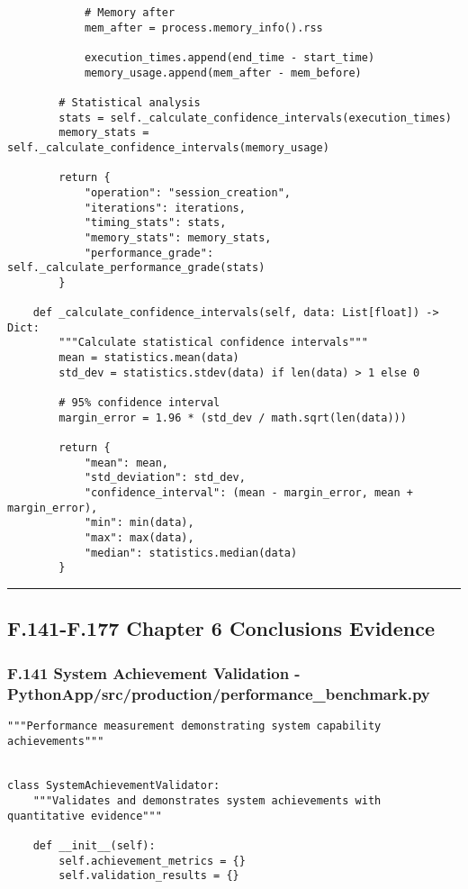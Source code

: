 \documentclass[12pt,a4paper]{report}
\begin{document}
{{\begin{verbatim}
            # Memory after
            mem_after = process.memory_info().rss

            execution_times.append(end_time - start_time)
            memory_usage.append(mem_after - mem_before)

        # Statistical analysis
        stats = self._calculate_confidence_intervals(execution_times)
        memory_stats = self._calculate_confidence_intervals(memory_usage)

        return {
            "operation": "session_creation",
            "iterations": iterations,
            "timing_stats": stats,
            "memory_stats": memory_stats,
            "performance_grade": self._calculate_performance_grade(stats)
        }

    def _calculate_confidence_intervals(self, data: List[float]) -> Dict:
        """Calculate statistical confidence intervals"""
        mean = statistics.mean(data)
        std_dev = statistics.stdev(data) if len(data) > 1 else 0

        # 95% confidence interval
        margin_error = 1.96 * (std_dev / math.sqrt(len(data)))

        return {
            "mean": mean,
            "std_deviation": std_dev,
            "confidence_interval": (mean - margin_error, mean + margin_error),
            "min": min(data),
            "max": max(data),
            "median": statistics.median(data)
        }
\end{verbatim}

\hrule

\subsection{F.141-F.177 Chapter 6 Conclusions Evidence}

\subsubsection{F.141 System Achievement Validation - PythonApp/src/production/performance_benchmark.py}

\begin{verbatim}
"""Performance measurement demonstrating system capability achievements"""


class SystemAchievementValidator:
    """Validates and demonstrates system achievements with quantitative evidence"""

    def __init__(self):
        self.achievement_metrics = {}
        self.validation_results = {}


\end{verbatim}}}
\end{document}
